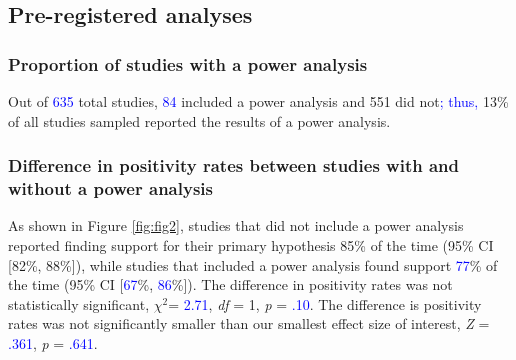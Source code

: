\documentclass[
  man, donotrepeattitle,mask,floatsintext]{apa7}
\begin{document}
\hypertarget{pre-registered-analyses-1}{%
\subsection{Pre-registered analyses}\label{pre-registered-analyses-1}}

\hypertarget{proportion-of-studies-with-a-power-analysis}{%
\subsubsection{Proportion of studies with a power analysis}\label{proportion-of-studies-with-a-power-analysis}}

Out of \textcolor{blue}{635} total studies, \textcolor{blue}{84} included a power analysis and 551 did not\textcolor{blue}{; thus,} 13\% of all studies sampled reported the results of a power analysis.

\hypertarget{difference-in-positivity-rates-between-studies-with-and-without-a-power-analysis}{%
\subsubsection{Difference in positivity rates between studies with and without a power analysis}\label{difference-in-positivity-rates-between-studies-with-and-without-a-power-analysis}}

As shown in Figure \ref{fig:fig2}, studies that did not include a power analysis reported finding support for their primary hypothesis 85\% of the time (95\% CI {[}82\%, 88\%{]}), while studies that included a power analysis found support \textcolor{blue}{77}\% of the time (95\% CI {[}\textcolor{blue}{67}\%, \textcolor{blue}{86}\%{]}). The difference in positivity rates was not statistically significant, \(\chi^2\)= \textcolor{blue}{2.71}, \emph{df} = 1, \emph{p} = \textcolor{blue}{.10}. The difference is positivity rates was not significantly smaller than our smallest effect size of interest, \emph{Z} = \textcolor{blue}{.361}, \emph{p} = \textcolor{blue}{.641}.

\pagebreak
\end{document}
